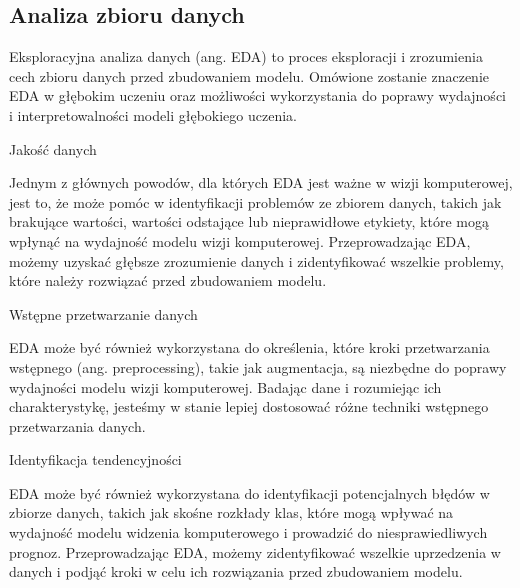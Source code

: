 \subsection{Analiza zbioru danych}
Eksploracyjna analiza danych (ang. EDA) to proces eksploracji i zrozumienia cech zbioru danych przed zbudowaniem modelu. Omówione zostanie znaczenie EDA w głębokim uczeniu oraz możliwości wykorzystania do poprawy wydajności i interpretowalności modeli głębokiego uczenia.

\noindent
Jakość danych

Jednym z głównych powodów, dla których EDA jest ważne w wizji komputerowej, jest to, że może pomóc w identyfikacji problemów ze zbiorem danych, takich jak brakujące wartości, wartości odstające lub nieprawidłowe etykiety, które mogą wpłynąć na wydajność modelu wizji komputerowej. Przeprowadzając EDA, możemy uzyskać głębsze zrozumienie danych i zidentyfikować wszelkie problemy, które należy rozwiązać przed zbudowaniem modelu.

\noindent
Wstępne przetwarzanie danych

EDA może być również wykorzystana do określenia, które kroki przetwarzania wstępnego (ang. preprocessing), takie jak augmentacja, są niezbędne do poprawy wydajności modelu wizji komputerowej. Badając dane i rozumiejąc ich charakterystykę, jesteśmy w stanie lepiej dostosować różne techniki wstępnego przetwarzania danych.

\noindent
Identyfikacja tendencyjności

EDA może być również wykorzystana do identyfikacji potencjalnych błędów w zbiorze danych, takich jak skośne rozkłady klas, które mogą wpływać na wydajność modelu widzenia komputerowego i prowadzić do niesprawiedliwych prognoz. Przeprowadzając EDA, możemy zidentyfikować wszelkie uprzedzenia w danych i podjąć kroki w celu ich rozwiązania przed zbudowaniem modelu.



